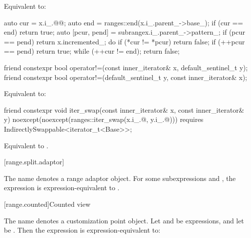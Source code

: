 \begin{itemdescr}
\pnum
\effects Equivalent to:
\begin{codeblock}
auto cur = x.i_.@@;
auto end = ranges::end(x.i_.parent_->base_);
if (cur == end) return true;
auto [pcur, pend] = subrange{x.i_.parent_->pattern_};
if (pcur == pend) return x.incremented_;
do {
  if (*cur != *pcur) return false;
  if (++pcur == pend) return true;
} while (++cur != end);
return false;
\end{codeblock}
\end{itemdescr}

%
\begin{itemdecl}
friend constexpr bool operator!=(const inner_iterator& x, default_sentinel_t y);
friend constexpr bool operator!=(default_sentinel_t y, const inner_iterator& x);
\end{itemdecl}

\begin{itemdescr}
\pnum
\effects Equivalent to: 
\end{itemdescr}

%
\begin{itemdecl}
friend constexpr void iter_swap(const inner_iterator& x, const inner_iterator& y)
  noexcept(noexcept(ranges::iter_swap(x.i_.@, y.i_.@)))
  requires IndirectlySwappable<iterator_t<Base>>;
\end{itemdecl}

\begin{itemdescr}
\pnum
\effects Equivalent to
.
\end{itemdescr}

[range.split.adaptor]{}

\pnum
The name  denotes a
range adaptor object.
For some subexpressions  and ,
the expression  is expression-equivalent to
.


[range.counted]{Counted view}

\pnum
The name  denotes a
customization point object.
Let  and  be expressions,
and let  be .
Then the expression  is expression-equivalent to:

